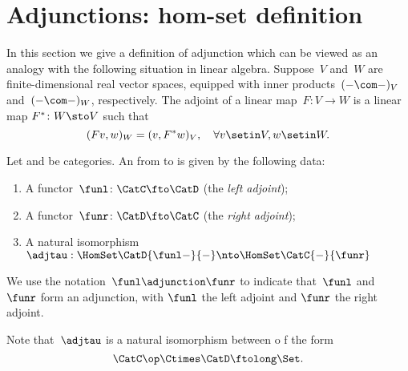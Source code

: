 

\section{Adjunctions: hom-set definition}
In this section we give a definition of adjunction which can be viewed as an analogy with the following situation in linear algebra.
Suppose~$V$ and~$W$ are finite-dimensional real vector spaces, equipped with inner products~$(-\com -)_V$ and~$(- \com -)_W$, respectively.
The adjoint of a linear map~$F\colon V \to W$ is a linear map $F^*\colon W \sto V$ such that
\begin{equation}
    (Fv, w)
    _W = (v, F^*w)_V, \quad \forall v \setin V, w \setin W.
\end{equation}

\begin{ctdefinition}
    \label{def:adj-iso}
    \label{def:cat-adjunction-v1}
    Let \CatC and \CatD be categories.
    An \emph{} from \CatC to \CatD is given by the following data:
    \begin{enumerate}
        \item A functor~$\funl\colon \CatC \fto \CatD$ (the \emph{left adjoint});
        \item A functor~$\funr\colon \CatD \fto \CatC$ (the \emph{right adjoint});
        \item A natural isomorphism~$\adjtau: \HomSet\CatD{\funl -}{-} \nto \HomSet\CatC{-}{\funr}$
    \end{enumerate}
    We use the notation~$\funl \adjunction  \funr$ to indicate that~$\funl$ and~$\funr$ form an adjunction, with $\funl$ the left adjoint and $\funr$ the right adjoint.
\end{ctdefinition}

\begin{remark}
    Note that~$\adjtau$ is a natural isomorphism between  o f the form
    \begin{equation}
        \CatC\op \Ctimes \CatD \ftolong   \Set.
    \end{equation}
\end{remark}

